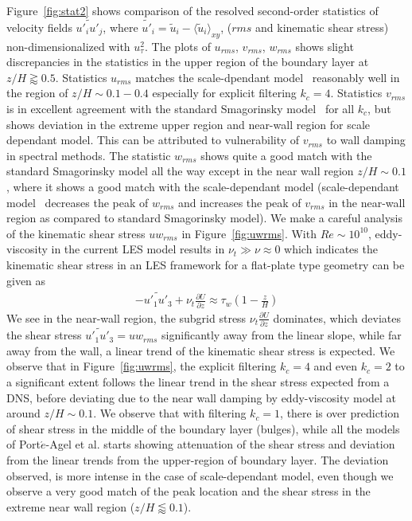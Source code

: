 \documentclass[times]{fldauth}
\begin{document}
\par
  Figure~\ref{fig:stat2} shows comparison of the resolved second-order statistics of velocity fields $\widetilde{{u'}_{i}{u'}_{j}}$, where $\widetilde{u'}_{i} = \widetilde{u}_{i} - \langle\widetilde{u}_{i}\rangle_{xy} $, ($rms$ and kinematic shear stress) non-dimensionalized with $u_{\tau}^{2}$. The plots of $u_{rms}$, $v_{rms}$, $w_{rms}$ shows slight discrepancies in the statistics in the upper region of the boundary layer at $z/H \gtrapprox 0.5$. Statistics $u_{rms}$  matches the scale-dpendant model~\cite{porte1fun} reasonably well in the region of $z/H \sim 0.1 - 0.4$ especially for explicit filtering $k_c = 4$. Statistics $v_{rms}$ is in excellent agreement with the standard Smagorinsky model~\cite{porte1fun} for all $k_{c}$, but shows deviation in the extreme upper region and near-wall region for scale dependant model. This can be attributed to vulnerability of $v_{rms}$ to wall damping in spectral methods. The statistic $w_{rms}$ shows quite a good match with the standard Smagorinsky model all the way except in the near wall region $z/H \sim 0.1$ , where it shows a good match with the scale-dependant model (scale-dependant model~\cite{porte1fun} decreases the peak of $w_{rms}$ and increases the peak of $v_{rms}$ in the near-wall region as compared to standard Smagorinsky model). We make a careful analysis of the kinematic shear stress $uw_{rms}$ in Figure~\ref{fig:uwrms}. With $Re \sim 10^{10}$, eddy-viscosity in the current LES model results in $\nu_{t} \gg \nu \approx 0$ which indicates the kinematic shear stress in an LES framework for a flat-plate type geometry can be given as
  \begin{align*}
-{\widetilde{u'_{1}u'_{3}}} + \nu_{t}\frac{\partial U}{\partial z} \approx \tau_{w}(1 - \frac{z}{H}) 
\end{align*}
 We see in the near-wall region, the subgrid stress $\nu_{t}\frac{\partial U}{\partial z}$ dominates, which deviates the shear stress $\widetilde{u'_{1}u'_{3}} = uw_{rms}$ significantly away from the linear slope, while far away from the wall, a linear trend of the kinematic shear stress is expected. We observe that in Figure~\ref{fig:uwrms}, the explicit filtering $k_c = 4$ and even $k_c = 2$ to a significant extent follows the linear trend in the shear stress expected from a DNS, before deviating due to the near wall damping by eddy-viscosity model at around $z/H \sim 0.1$. We observe that with filtering $k_c = 1$, there is over prediction of shear stress in the middle of the boundary layer (bulges), while all the models of Port$\acute{e}$-Agel et al. starts showing attenuation of the shear stress and deviation from the linear trends from the upper-region of boundary layer. The deviation observed, is more intense in the case of scale-dependant model, even though we observe a very good match of the peak location and the shear stress in the extreme near wall region ($z/H \lessapprox 0.1$).\\
\end{document}
